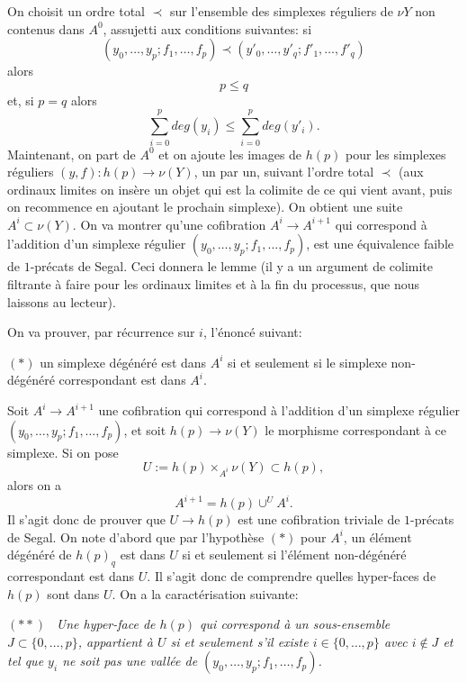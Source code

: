 \documentclass[12pt]{article}
\begin{document}
On choisit un ordre total $\prec$ sur l'ensemble des simplexes r\'eguliers de
$\nu Y$ non contenus dans $A^0$, assujetti aux conditions suivantes: si
$$
(y_0,\ldots , y_p; f_1,\ldots , f_p) \prec
(y'_0,\ldots , y'_q; f'_1,\ldots , f'_q)
$$
alors
$$
p\leq q
$$
et, si $p=q$ alors
$$
\sum _{i=0}^p deg (y_i) \leq \sum _{i=0}^p deg(y'_i).
$$
Maintenant, on part de $A^0$ et on ajoute les images de $h(p)$ pour les
simplexes r\'eguliers $(y,f): h(p)\rightarrow \nu (Y)$, un par un, suivant
l'ordre total $\prec$ (aux ordinaux limites on ins\`ere un objet qui est la
colimite de ce qui vient avant, puis on recommence en ajoutant le prochain
simplexe). On obtient une suite $A^i\subset \nu (Y)$. On va montrer qu'une
cofibration $A^i\rightarrow A^{i+1}$ qui correspond \`a l'addition d'un
simplexe r\'egulier $(y_0,\ldots , y_p; f_1,\ldots , f_p)$, est une
\'equivalence faible de $1$-pr\'ecats de Segal. Ceci donnera le lemme
(il y a un argument de colimite filtrante \`a faire pour les ordinaux limites et
\`a la fin du processus, que nous laissons au lecteur).


On va prouver, par r\'ecurrence sur $i$, l'\'enonc\'e suivant:

$(\ast )$ un simplexe d\'eg\'en\'er\'e
est dans $A^i$ si et seulement si le simplexe non-d\'eg\'en\'er\'e
correspondant  est dans $A^i$.

Soit $A^i\rightarrow A^{i+1}$ une cofibration qui correspond \`a
l'addition d'un simplexe r\'egulier $(y_0,\ldots , y_p; f_1,\ldots , f_p)$, et
soit $h(p)\rightarrow \nu (Y)$ le morphisme correspondant \`a ce simplexe.
Si on pose
$$
U:= h(p)\times _{A^i} \nu (Y) \subset h(p),
$$
alors on a
$$
A^{i+1} = h(p)\cup ^U A^i.
$$
Il s'agit donc de prouver que $U\rightarrow h(p)$ est une cofibration triviale
de $1$-pr\'ecats de Segal. On note d'abord que par l'hypoth\`ese $(\ast )$ pour
$A^i$, un \'el\'ement d\'eg\'en\'er\'e de $h(p)_q$ est dans $U$ si et seulement
si l'\'el\'ement non-d\'eg\'en\'er\'e correspondant est dans $U$. Il s'agit donc
de comprendre quelles hyper-faces de $h(p)$ sont dans $U$. On a la
caract\'erisation suivante:

$(\ast \ast )$ \, {\em Une hyper-face de $h(p)$ qui correspond \`a un
sous-ensemble $J\subset \{ 0,\ldots , p\}$, appartient \`a $U$ si et seulement
s'il existe $i\in \{ 0,\ldots , p\}$ avec $i\not \in J$ et  tel que $y_i$ ne
soit pas une
vall\'ee de $(y_0,\ldots , y_p; f_1,\ldots , f_p)$.}
\end{document}
